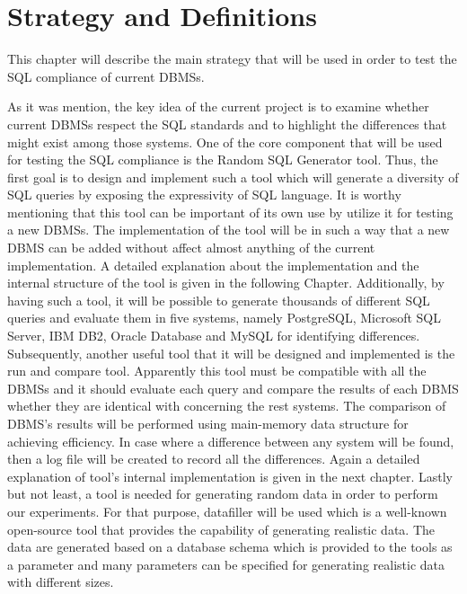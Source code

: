 \chapter{Strategy and Definitions}
This chapter will describe the main strategy that will be used in order to test the SQL compliance of current DBMSs. 
 
As it was mention, the key idea of the current project is to examine whether current DBMSs respect the SQL standards and to highlight the differences that might exist among those systems. One of the core component that will be used  for testing the SQL compliance is the Random SQL Generator tool. Thus, the first goal is to design and implement such a tool which will generate a diversity of SQL queries by exposing the expressivity of SQL language. It is worthy mentioning that this tool can be important of its own use by utilize it for testing a new DBMSs. The implementation of the tool will be in such a way that a new DBMS can be added without affect almost anything of the current implementation. A detailed explanation about the implementation and the internal structure of the tool is given in the following Chapter. Additionally, by having such a tool, it will be possible to generate thousands of different SQL queries and evaluate them in five systems, namely PostgreSQL, Microsoft SQL Server, IBM DB2, Oracle Database and MySQL for identifying differences. 
Subsequently, another useful tool that it will be designed and implemented is the run and compare tool. Apparently this tool must be compatible with all the DBMSs and it should evaluate each query and compare the results of each DBMS whether they are identical with concerning the rest systems. The comparison of DBMS’s results will be performed using main-memory data structure for achieving efficiency. In case where a difference between any system will be found, then a log file will be created to record all the differences. Again a detailed explanation of tool’s internal implementation is given in the next chapter.
Lastly but not least, a tool is needed for generating random data in order to perform our experiments. For that purpose, datafiller will be used which is a well-known open-source tool that provides the capability of generating realistic data. The data are generated based on a database schema which is provided to the tools as a parameter and many parameters can be specified for generating realistic data with different sizes. 



 